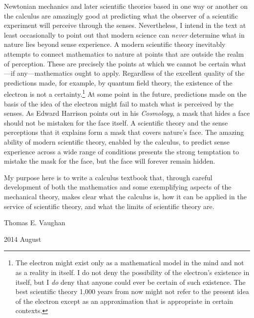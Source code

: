 Newtonian mechanics and later scientific theories based in one way or another
on the calculus are amazingly good at predicting what the observer of a
scientific experiment will perceive through the senses.  Nevertheless, I intend
in the text at least occasionally to point out that modern science can
\emph{never} determine what in nature lies beyond sense experience. A modern
scientific theory inevitably attempts to connect mathematics to nature at
points that are outside the realm of perception. These are precisely the points
at which we cannot be certain what---if any---mathematics ought to apply.
Regardless of the excellent quality of the predictions made, for example, by
quantum field theory, the existence of the electron is not a
certainty.\footnote{%
   The electron might exist only as a mathematical model in the mind and not as
   a reality in itself.  I do not deny the possibility of the electron's
   existence in itself, but I \emph{do} deny that anyone could ever be certain
   of such existence. The best scientific theory 1,000 years from now might not
   refer to the present idea of the electron except as an approximation that is
   appropriate in certain contexts.
}
At some point in the future, predictions made on the basis of the idea of the
electron might fail to match what is perceived by the senses.  As Edward
Harrison points out in his {\it Cosmology}, a mask that hides a face should not
be mistaken for the face itself. A scientific theory and the sense perceptions
that it explains form a mask that covers nature's face. The amazing ability of
modern scientific theory, enabled by the calculus, to predict sense experience
across a wide range of conditions presents the strong temptation to mistake the
mask for the face, but the face will forever remain hidden.

My purpose here is to write a calculus textbook that, through careful
development of both the mathematics and some exemplifying aspects of the
mechanical theory, makes clear what the calculus is, how it can be applied in
the service of scientific theory, and what the limits of scientific theory are.

\vspace{0.25in}

\begin{flushright}
Thomas E. Vaughan

2014 August
\end{flushright}

